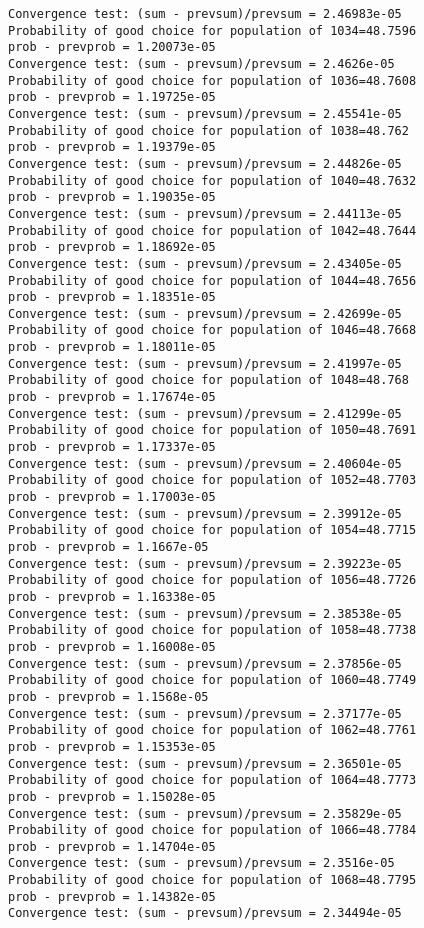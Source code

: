 \documentclass[11pt,onecolumn]{article}
\begin{document}
\begin{verbatim}
Convergence test: (sum - prevsum)/prevsum = 2.46983e-05
Probability of good choice for population of 1034=48.7596
prob - prevprob = 1.20073e-05
Convergence test: (sum - prevsum)/prevsum = 2.4626e-05
Probability of good choice for population of 1036=48.7608
prob - prevprob = 1.19725e-05
Convergence test: (sum - prevsum)/prevsum = 2.45541e-05
Probability of good choice for population of 1038=48.762
prob - prevprob = 1.19379e-05
Convergence test: (sum - prevsum)/prevsum = 2.44826e-05
Probability of good choice for population of 1040=48.7632
prob - prevprob = 1.19035e-05
Convergence test: (sum - prevsum)/prevsum = 2.44113e-05
Probability of good choice for population of 1042=48.7644
prob - prevprob = 1.18692e-05
Convergence test: (sum - prevsum)/prevsum = 2.43405e-05
Probability of good choice for population of 1044=48.7656
prob - prevprob = 1.18351e-05
Convergence test: (sum - prevsum)/prevsum = 2.42699e-05
Probability of good choice for population of 1046=48.7668
prob - prevprob = 1.18011e-05
Convergence test: (sum - prevsum)/prevsum = 2.41997e-05
Probability of good choice for population of 1048=48.768
prob - prevprob = 1.17674e-05
Convergence test: (sum - prevsum)/prevsum = 2.41299e-05
Probability of good choice for population of 1050=48.7691
prob - prevprob = 1.17337e-05
Convergence test: (sum - prevsum)/prevsum = 2.40604e-05
Probability of good choice for population of 1052=48.7703
prob - prevprob = 1.17003e-05
Convergence test: (sum - prevsum)/prevsum = 2.39912e-05
Probability of good choice for population of 1054=48.7715
prob - prevprob = 1.1667e-05
Convergence test: (sum - prevsum)/prevsum = 2.39223e-05
Probability of good choice for population of 1056=48.7726
prob - prevprob = 1.16338e-05
Convergence test: (sum - prevsum)/prevsum = 2.38538e-05
Probability of good choice for population of 1058=48.7738
prob - prevprob = 1.16008e-05
Convergence test: (sum - prevsum)/prevsum = 2.37856e-05
Probability of good choice for population of 1060=48.7749
prob - prevprob = 1.1568e-05
Convergence test: (sum - prevsum)/prevsum = 2.37177e-05
Probability of good choice for population of 1062=48.7761
prob - prevprob = 1.15353e-05
Convergence test: (sum - prevsum)/prevsum = 2.36501e-05
Probability of good choice for population of 1064=48.7773
prob - prevprob = 1.15028e-05
Convergence test: (sum - prevsum)/prevsum = 2.35829e-05
Probability of good choice for population of 1066=48.7784
prob - prevprob = 1.14704e-05
Convergence test: (sum - prevsum)/prevsum = 2.3516e-05
Probability of good choice for population of 1068=48.7795
prob - prevprob = 1.14382e-05
Convergence test: (sum - prevsum)/prevsum = 2.34494e-05

\end{verbatim}
\end{document}
